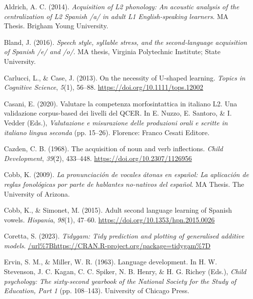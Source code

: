 \documentclass[
  letterpaper,
  DIV=11,
  numbers=noendperiod]{scrartcl}
\newlength{\cslhangindent}
\newenvironment{CSLReferences}[2] %
 {\begin{list}{}{%
  \setlength{\itemindent}{0pt}
  \setlength{\leftmargin}{0pt}
  \setlength{\parsep}{0pt}
  \ifodd #1
   \setlength{\leftmargin}{\cslhangindent}
   \setlength{\itemindent}{-1\cslhangindent}
  \fi
  \setlength{\itemsep}{#2\baselineskip}}}
 {\end{list}}
\begin{document}
\label{refs}
\begin{CSLReferences}{1}{0}
Aldrich, A. C. (2014). \emph{Acquisition of {L}2 phonology: An acoustic
analysis of the centralization of {L}2 {S}panish /a/ in adult {L}1
{E}nglish-speaking learners}. MA Thesis. Brigham Young University.

Bland, J. (2016). \emph{Speech style, syllable stress, and the
second-language acquisition of {S}panish /e/ and /o/}. MA thesis,
Virginia Polytechnic Institute; State University.

Carlucci, L., \& Case, J. (2013). On the necessity of {U}-shaped
learning. \emph{Topics in Cognitive Science}, \emph{5}(1), 56--88.
\url{https://doi.org/10.1111/tops.12002}

Casani, E. (2020). Valutare la competenza morfosintattica in italiano
{L}2. Una validazione corpus-based dei livelli del {QCER}. In E. Nuzzo,
E. Santoro, \& I. Vedder (Eds.), \emph{Valutazione e misurazione delle
produzioni orali e scritte in italiano lingua seconda} (pp. 15--26).
Florence: Franco Cesati Editore.

Cazden, C. B. (1968). The acquisition of noun and verb inflections.
\emph{Child Development}, \emph{39}(2), 433--448.
\url{https://doi.org/10.2307/1126956}

Cobb, K. (2009). \emph{La pronunciaci{ó}n de vocales {á}tonas en
espa{ñ}ol: La aplicaci{ó}n de reglas fonol{ó}gicas por parte de
hablantes no-nativos del espa{ñ}ol}. MA Thesis. The University of
Arizona.

Cobb, K., \& Simonet, M. (2015). Adult second language learning of
{S}panish vowels. \emph{Hispania}, \emph{98}(1), 47--60.
\url{https://doi.org/10.1353/hpn.2015.0026}

Coretta, S. (2023). \emph{Tidygam: Tidy prediction and plotting of
generalised additive models}.
\url{/url\%7Bhttps://CRAN.R-project.org/package=tidygam\%7D}

Ervin, S. M., \& Miller, W. R. (1963). Language development. In H. W.
Stevenson, J. C. Kagan, C. C. Spiker, N. B. Henry, \& H. G. Richey
(Eds.), \emph{Child psychology: The sixty-second yearbook of the
{National Society for the Study of Education}, {P}art 1} (pp. 108--143).
University of Chicago Press.


\end{CSLReferences}
\end{document}
